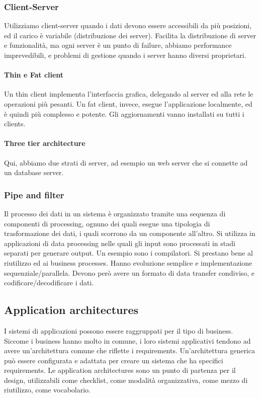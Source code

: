 \documentclass[11pt]{article}
\begin{document}
\subsubsection{Client-Server}
Utilizziamo client-server quando i dati devono essere accessibili da più posizioni, ed il carico è variabile (distribuzione dei server). Facilita la distribuzione di server e funzionalità, ma ogni server è un punto di failure, abbiamo performance imprevedibili, e problemi di gestione quando i server hanno diversi proprietari.
\paragraph{Thin e Fat client} Un thin client implementa l'interfaccia grafica, delegando al server ed alla rete le operazioni più pesanti. Un fat client, invece, esegue l'applicazione localmente, ed è quindi più complesso e potente. Gli aggiornamenti vanno installati su tutti i clients.
\paragraph{Three tier architecture}Qui, abbiamo due strati di server, ad esempio un web server che si connette ad un database server.
\subsubsection{Pipe and filter}
Il processo dei dati in un sistema è organizzato tramite una sequenza di componenti di processing, ognuno dei quali esegue una tipologia di trasformazione dei dati, i quali scorrono da un componente all'altro. Si utilizza in applicazioni di data processing nelle quali gli input sono processati in stadi separati per generare output. Un esempio sono i compilatori. Si prestano bene al riutilizzo ed ai business processes. Hanno evoluzione semplice e implementazione sequenziale/parallela. Devono però avere un formato di data transfer condiviso, e codificare/decodificare i dati. 
\subsection{Application architectures}
I sistemi di applicazioni possono essere raggruppati per il tipo di business. Siccome i business hanno molto in comune, i loro sistemi applicativi tendono ad avere un'architettura comune che riflette i requirements.
Un'architettura generica può essere configurata e adattata per creare un sistema che ha specifici requirements. Le application architectures sono un punto di partenza per il design, utilizzabili come checklist, come modalità organizzativa, come mezzo di riutilizzo, come vocabolario. 
\end{document}
